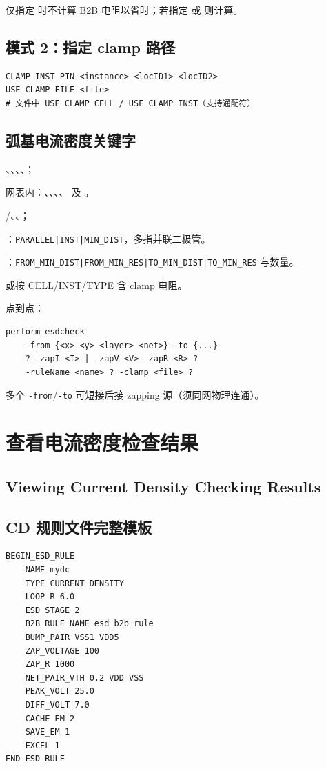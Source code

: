 仅指定  时不计算 B2B 电阻以省时；若指定  或  则计算。

\subsection{模式 2：指定 clamp 路径}
\begin{lstlisting}
CLAMP_INST_PIN <instance> <locID1> <locID2>
USE_CLAMP_FILE <file>
# 文件中 USE_CLAMP_CELL / USE_CLAMP_INST（支持通配符）
\end{lstlisting}

\subsection{弧基电流密度关键字}
、、、、；

网表内：、、、、 及 。

/、、；

：\texttt{PARALLEL|INST|MIN_DIST}，多指并联二极管。

：\texttt{FROM_MIN_DIST|FROM_MIN_RES|TO_MIN_DIST|TO_MIN_RES} 与数量。

 或按 CELL/INST/TYPE 含 clamp 电阻。

点到点：
\begin{lstlisting}
perform esdcheck
    -from {<x> <y> <layer> <net>} -to {...}
    ? -zapI <I> | -zapV <V> -zapR <R> ?
    -ruleName <name> ? -clamp <file> ?
\end{lstlisting}
多个 \texttt{-from}/\texttt{-to} 可短接后接 zapping 源（须同网物理连通）。

\section{查看电流密度检查结果}
\subsection*{Viewing Current Density Checking Results}

\subsection{CD 规则文件完整模板}
\begin{lstlisting}
BEGIN_ESD_RULE
    NAME mydc
    TYPE CURRENT_DENSITY
    LOOP_R 6.0
    ESD_STAGE 2
    B2B_RULE_NAME esd_b2b_rule
    BUMP_PAIR VSS1 VDD5
    ZAP_VOLTAGE 100
    ZAP_R 1000
    NET_PAIR_VTH 0.2 VDD VSS
    PEAK_VOLT 25.0
    DIFF_VOLT 7.0
    CACHE_EM 2
    SAVE_EM 1
    EXCEL 1
END_ESD_RULE
\end{lstlisting}

